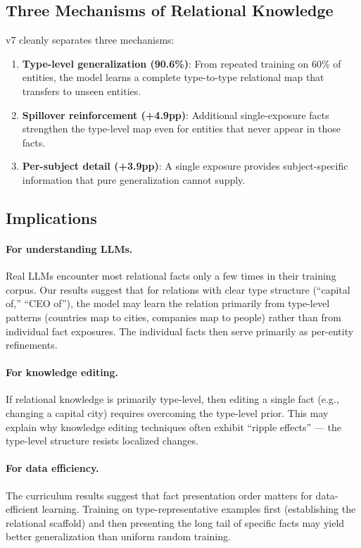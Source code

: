 \documentclass[11pt]{article}
\begin{document}
\subsection{Three Mechanisms of Relational Knowledge}

v7 cleanly separates three mechanisms:
\begin{enumerate}
\item \textbf{Type-level generalization (90.6\%)}:  From repeated training on 60\% of
  entities, the model learns a complete type-to-type relational map that transfers to
  unseen entities.
\item \textbf{Spillover reinforcement (+4.9pp)}:  Additional single-exposure facts
  strengthen the type-level map even for entities that never appear in those facts.
\item \textbf{Per-subject detail (+3.9pp)}:  A single exposure provides subject-specific
  information that pure generalization cannot supply.
\end{enumerate}

\subsection{Implications}

\paragraph{For understanding LLMs.}
Real LLMs encounter most relational facts only a few times in their training corpus.
Our results suggest that for relations with clear type structure (``capital of,''
``CEO of''), the model may learn the relation primarily from type-level patterns
(countries map to cities, companies map to people) rather than from individual fact
exposures.  The individual facts then serve primarily as per-entity refinements.

\paragraph{For knowledge editing.}
If relational knowledge is primarily type-level, then editing a single fact (e.g.,
changing a capital city) requires overcoming the type-level prior.  This may explain
why knowledge editing techniques often exhibit ``ripple effects'' --- the type-level
structure resists localized changes.

\paragraph{For data efficiency.}
The curriculum results suggest that fact presentation order matters for data-efficient
learning.  Training on type-representative examples first (establishing the relational
scaffold) and then presenting the long tail of specific facts may yield better
generalization than uniform random training.
\end{document}
